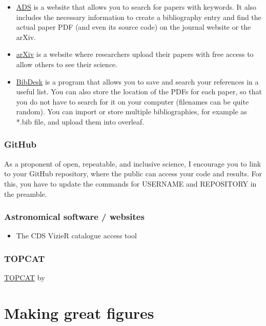 \documentclass[fleqn,usenatbib]{mnras}
\newcommand{\githubusername}{USERNAME}
\newcommand{\githubrepository}{REPOSITORY}
\begin{document}
\begin{itemize}
    \item \href{https://ui.adsabs.harvard.edu}{ADS} is a website that allows you to search for papers with keywords. It also includes the necessary information to create a bibliography entry and find the actual paper PDF (and even its source code) on the journal website or the arXiv.
    \item \href{https://arxiv.org}{arXiv} is a website where researchers upload their papers with free access to allow others to see their science.
    \item \href{https://bibdesk.sourceforge.io}{BibDesk} is a program that allows you to save and search your references in a useful list. You can also store the location of the PDFs for each paper, so that you do not have to search for it on your computer (filenames can be quite random). You can import or store multiple bibliographies, for example as *.bib file, and upload them into overleaf.
\end{itemize}

\subsubsection{GitHub}

As a proponent of open, repeatable, and inclusive science, I encourage you to link to your GitHub repository, where the public can access your code and results. For this, you have to update the commands for \githubusername\xspace and \githubrepository\xspace in the preamble.

\subsubsection{Astronomical software / websites}

\begin{itemize}
    \item The CDS VizieR catalogue access tool \citep{Vizier2000} 
\end{itemize}


\subsubsection{TOPCAT}

\href{https://www.star.bris.ac.uk/~mbt/topcat/}{\textsc{TOPCAT}} by 



\section{Making great figures} \label{sec:figures}
\end{document}
